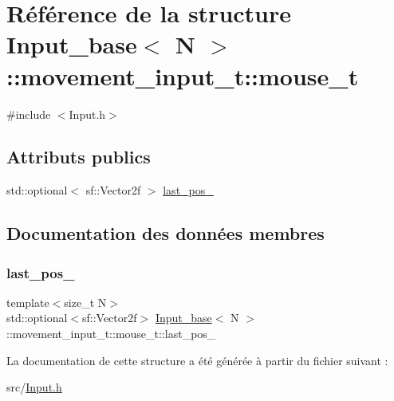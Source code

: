 \hypertarget{struct_input__base_1_1movement__input__t_1_1mouse__t}{}\section{Référence de la structure Input\+\_\+base$<$ N $>$\+:\+:movement\+\_\+input\+\_\+t\+:\+:mouse\+\_\+t}
\label{struct_input__base_1_1movement__input__t_1_1mouse__t}


{\ttfamily \#include $<$Input.\+h$>$}

\subsection*{Attributs publics}
\begin{DoxyCompactItemize}
\item 
std\+::optional$<$ sf\+::\+Vector2f $>$ \hyperlink{struct_input__base_1_1movement__input__t_1_1mouse__t_abb22b79e3d13bb8333a5c826cca0888f}{last\+\_\+pos\+\_\+}
\end{DoxyCompactItemize}


\subsection{Documentation des données membres}
\mbox{\label{struct_input__base_1_1movement__input__t_1_1mouse__t_abb22b79e3d13bb8333a5c826cca0888f}} 
\subsubsection{\texorpdfstring{last\+\_\+pos\+\_\+}{last\_pos\_}}
{\footnotesize\ttfamily template$<$size\+\_\+t N$>$ \\
std\+::optional$<$sf\+::\+Vector2f$>$ \hyperlink{class_input__base}{Input\+\_\+base}$<$ N $>$\+::movement\+\_\+input\+\_\+t\+::mouse\+\_\+t\+::last\+\_\+pos\+\_\+}



La documentation de cette structure a été générée à partir du fichier suivant \+:\begin{DoxyCompactItemize}
\item 
src/\hyperlink{_input_8h}{Input.\+h}\end{DoxyCompactItemize}
